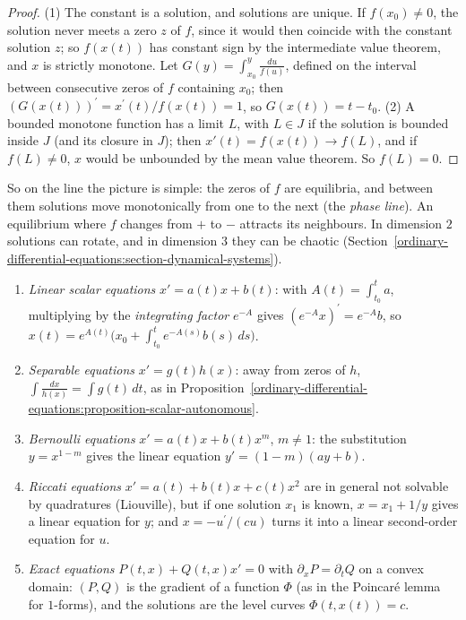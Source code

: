 \begin{proof}
(1) The constant is a solution, and solutions are unique. If $f(x_0) \neq 0$, the solution never meets a zero $z$ of $f$, since it would then coincide with the constant solution $z$; so $f(x(t))$ has constant sign by the
intermediate value theorem, and $x$ is strictly monotone. Let $G(y) = \int_{x_0}^y\frac{du}{f(u)}$, defined on the interval between consecutive zeros of $f$ containing $x_0$; then $(G(x(t)))^{\prime} = x^{\prime}(t)/f(x(t)) = 1$, so
$G(x(t)) = t - t_0$. (2) A bounded monotone function has a limit $L$, with $L \in J$ if the solution is bounded inside $J$ (and its closure in $J$); then $x'(t) = f(x(t)) \to f(L)$, and if $f(L) \neq 0$, $x$ would be unbounded by the mean
value theorem. So $f(L) = 0$.
\end{proof}

So on the line the picture is simple: the zeros of $f$ are equilibria, and between them solutions move monotonically from one to the next (the \emph{phase line}). An equilibrium where $f$ changes from $+$ to $-$ attracts its
neighbours. In dimension $2$ solutions can rotate, and in dimension $3$ they can be chaotic (Section~\ref{ordinary-differential-equations:section-dynamical-systems}).

\begin{example}\label{ordinary-differential-equations:example-solvable}
\begin{enumerate}
\item \emph{Linear scalar equations} $x' = a(t)x + b(t)$: with $A(t) = \int_{t_0}^ta$, multiplying by the \emph{integrating factor} $e^{-A}$ gives $(e^{-A}x)^{\prime} = e^{-A}b$, so
$x(t) = e^{A(t)}\bigl(x_0 + \int_{t_0}^te^{-A(s)}b(s)\,ds\bigr)$.
\item \emph{Separable equations} $x' = g(t)h(x)$: away from zeros of $h$, $\int\frac{dx}{h(x)} = \int g(t)\,dt$, as in Proposition~\ref{ordinary-differential-equations:proposition-scalar-autonomous}.
\item \emph{Bernoulli equations} $x' = a(t)x + b(t)x^m$, $m \neq 1$: the substitution $y = x^{1-m}$ gives the linear equation $y' = (1 - m)(a y + b)$.
\item \emph{Riccati equations} $x' = a(t) + b(t)x + c(t)x^2$ are in general not solvable by quadratures (Liouville), but if one solution $x_1$ is known, $x = x_1 + 1/y$ gives a linear equation for $y$; and $x = -u^{\prime}/(cu)$ turns
it into a linear second-order equation for $u$.
\item \emph{Exact equations} $P(t, x) + Q(t, x)x' = 0$ with $\partial_xP = \partial_tQ$ on a convex domain: $(P, Q)$ is the gradient of a function $\Phi$ (as in the Poincar\'e lemma for $1$-forms), and the solutions are the level curves
$\Phi(t, x(t)) = c$.
\end{enumerate}
\end{example}

